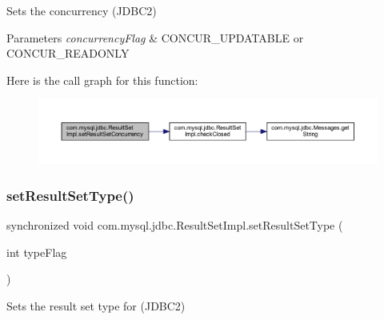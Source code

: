 Sets the concurrency (J\+D\+B\+C2)


\begin{DoxyParams}{Parameters}
{\em concurrency\+Flag} & C\+O\+N\+C\+U\+R\+\_\+\+U\+P\+D\+A\+T\+A\+B\+LE or C\+O\+N\+C\+U\+R\+\_\+\+R\+E\+A\+D\+O\+N\+LY \\
\hline
\end{DoxyParams}
Here is the call graph for this function\+:
\nopagebreak
\begin{figure}[H]
\begin{center}
\leavevmode
\includegraphics[width=350pt]{classcom_1_1mysql_1_1jdbc_1_1_result_set_impl_a92cd52b204364dd65d6a2c3a4d5798a4_cgraph}
\end{center}
\end{figure}
\mbox{\label{classcom_1_1mysql_1_1jdbc_1_1_result_set_impl_af96271eb91709c3bb9cd6d35b7b82617}} 
\subsubsection{\texorpdfstring{set\+Result\+Set\+Type()}{setResultSetType()}}
{\footnotesize\ttfamily synchronized void com.\+mysql.\+jdbc.\+Result\+Set\+Impl.\+set\+Result\+Set\+Type (\begin{DoxyParamCaption}\item[{int}]{type\+Flag }\end{DoxyParamCaption})\hspace{0.3cm}{\ttfamily [protected]}}

Sets the result set type for (J\+D\+B\+C2)



